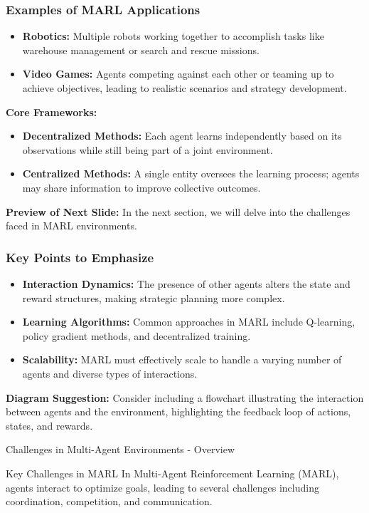 \documentclass[aspectratio=169]{beamer}
\begin{document}
\begin{frame}[fragile]
    \frametitle{Examples of MARL Applications}
    \begin{itemize}
        \item \textbf{Robotics:} Multiple robots working together to accomplish tasks like warehouse management or search and rescue missions.
        \item \textbf{Video Games:} Agents competing against each other or teaming up to achieve objectives, leading to realistic scenarios and strategy development.
    \end{itemize}
    
    \textbf{Core Frameworks:}
    \begin{itemize}
        \item \textbf{Decentralized Methods:} Each agent learns independently based on its observations while still being part of a joint environment.
        \item \textbf{Centralized Methods:} A single entity oversees the learning process; agents may share information to improve collective outcomes.
    \end{itemize}
    
    \textbf{Preview of Next Slide:} In the next section, we will delve into the challenges faced in MARL environments.
\end{frame}

\begin{frame}[fragile]
    \frametitle{Key Points to Emphasize}
    \begin{itemize}
        \item \textbf{Interaction Dynamics:} The presence of other agents alters the state and reward structures, making strategic planning more complex.
        \item \textbf{Learning Algorithms:} Common approaches in MARL include Q-learning, policy gradient methods, and decentralized training.
        \item \textbf{Scalability:} MARL must effectively scale to handle a varying number of agents and diverse types of interactions.
    \end{itemize}
    
    \textbf{Diagram Suggestion:} Consider including a flowchart illustrating the interaction between agents and the environment, highlighting the feedback loop of actions, states, and rewards.
\end{frame}

\begin{frame}[fragile]{Challenges in Multi-Agent Environments - Overview}
    \begin{block}{Key Challenges in MARL}
        In Multi-Agent Reinforcement Learning (MARL), agents interact to optimize goals, leading to several challenges including coordination, competition, and communication.
    \end{block}
\end{frame}
\end{document}
